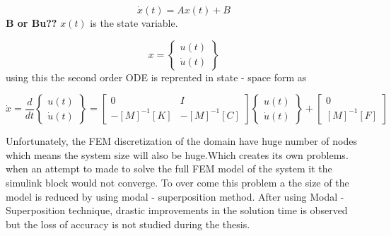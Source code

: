 \documentclass[main.tex]{subfiles}
\begin{document}
\begin{equation}\label{eq:SpaceState}
\dot{x}(t)=Ax(t)+B
\end{equation}
\textbf{B or Bu??}
$x(t)$ is the state variable.

\begin{equation}
{x} = 
\left\{
\begin{array}{r}
u(t)
\\
\dot{u}(t)
\end{array}
\right\}
\end{equation}
using this the second order ODE is reprented in state - space form as

\begin{equation}
\dot{x} = \frac{d}{dt}
\left\{
 \begin{array}{r}  u(t)  \\  \dot{u}(t) \end{array}
\right\}
=
\begin{bmatrix}
0 & I \\
-\left[M\right] ^{-1} \left[K\right]  &   -\left[M\right] ^{-1} \left[C\right]
\end{bmatrix}
\left\{
\begin{array}{r}
u(t)
\\
\dot{u}(t)
\end{array}
\right\}
+
\begin{bmatrix}
0 \\
\left[M\right] ^{-1} \left[F\right] 
\end{bmatrix}
\end{equation}

Unfortunately, the FEM discretization of the domain have huge number of nodes which means the system size will also be huge.Which creates its own problems. when an attempt to made to solve the full FEM model of the system it the simulink block would not converge. To over come this problem a the size of the model is reduced by using modal - superposition method. After using Modal - Superposition technique, drastic improvements in the solution time is observed but the loss of accuracy is not studied during the thesis.  
\end{document}
